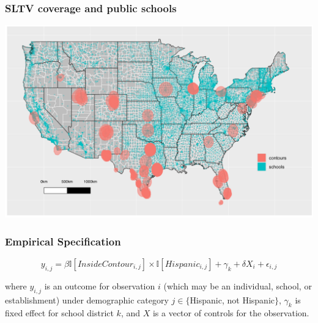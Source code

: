 \documentclass{beamer}
\begin{document}
\begin{frame}
\frametitle{SLTV coverage and public schools}
\centering
        \includegraphics[width=1\textwidth]{../../analysis/Output/img/Schools_pretty2.pdf}\\
\end{frame}

\begin{frame}
\frametitle{Empirical Specification}

\[ y_{i,j} =  \beta \mathbb{I}[InsideContour_{i,j}] \times \mathbb{I}[Hispanic_{i,j}] + \gamma_k + \delta  X_i + \epsilon_{i,j} \]

\vspace{5pt}

where $y_{i,j}$ is an outcome for observation $i$ (which may be an individual, school, or establishment) under demographic category $j \in \{$Hispanic, not Hispanic$\}$, $\gamma_k$ is fixed effect for school district $k$, and $X$ is a vector of controls for the observation. 


\end{frame}








\end{document}
